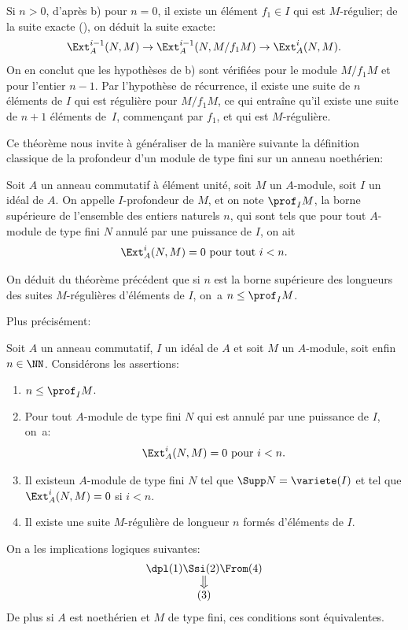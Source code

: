 Si $n>0$, d'apr\`es b) pour $n=0$, il existe un \'el\'ement $f_1\in I$ qui est $M$-r\'egulier; de la suite exacte (), on d\'eduit la suite exacte:
\begin{equation} \label{eq:III.2.2} \Ext_A^{i-1} (N, M) \to \Ext_A^{i-1} (N, M/f_1M) \to \Ext_A^i (N, M).
\end{equation}
On en conclut que les hypoth\`eses de b) sont v\'erifi\'ees pour le
module $M/f_1M$ et pour l'entier $n-1$. Par l'hypoth\`ese de
r\'ecurrence, il existe une suite de $n$ \'el\'ements de $I$ qui est
r\'eguli\`ere pour $M/f_1M$, ce qui entra\^ine qu'il existe une
suite de $n+1$ \'el\'ements de~$I$, commen\c cant par $f_1$, et qui
est $M$-r\'eguli\`ere.

Ce th\'eor\`eme nous invite \`a g\'en\'eraliser de la mani\`ere suivante la d\'efinition classique de la profondeur d'un module de type fini sur un anneau noeth\'erien:

\begin{definition} \label{III.2.3}
Soit $A$ un anneau commutatif \`a \'el\'ement unit\'e, soit $M$ un $A$-module, soit $I$ un id\'eal de $A$. On appelle $I$-profondeur de $M$, et on note $\prof_I M$, la borne sup\'erieure \ignorespaces de l'ensemble des entiers naturels $n$, qui sont tels que pour tout $A$-module de type fini $N$ annul\'e par une puissance de $I$, on ait
\[
\Ext_A^i(N, M)=0 \text{ pour tout } i< n.
\]
\end{definition}

On d\'eduit du th\'eor\`eme pr\'ec\'edent que si $n$ est la borne sup\'erieure des longueurs des suites $M$-r\'eguli\`eres d'\'el\'ements de $I$, on~a $n\leq\prof_I M$.

\noindent Plus pr\'ecis\'ement:

\begin{proposition} \label{III.2.4}
Soit $A$ un anneau commutatif, $I$ un id\'eal de $A$ et soit $M$ un $A$-module, soit enfin $n\in \NN$. Consid\'erons les assertions:
\begin{enumerate}
\item
$n\leq \prof_I M$.
\item
Pour tout $A$-module de type fini $N$ qui est annul\'e par une puissance de $I$, on~a:
\[
\Ext_A^i(N, M)=0 \text{ pour } i<n.
\]
\item
Il existe\pageoriginale un $A$-module de type fini $N$ tel que $\Supp N = \variete(I)$ et tel que $\Ext_A^i(N, M)=0$ si $i<n$.
\item
Il existe une suite $M$-r\'eguli\`ere de longueur $n$ form\'es d'\'el\'ements de $I$.
\end{enumerate}

On a les implications logiques suivantes:
\[
\begin{array}{c}\dpl \textup{(1)} \Ssi \textup{(2)} \From (4) \\
\big\Downarrow \\
\textup{(3)} \\
\end{array}
\]
De plus si $A$ est noeth\'erien et $M$ de type fini, ces conditions sont \'equivalentes.
\end{proposition}

